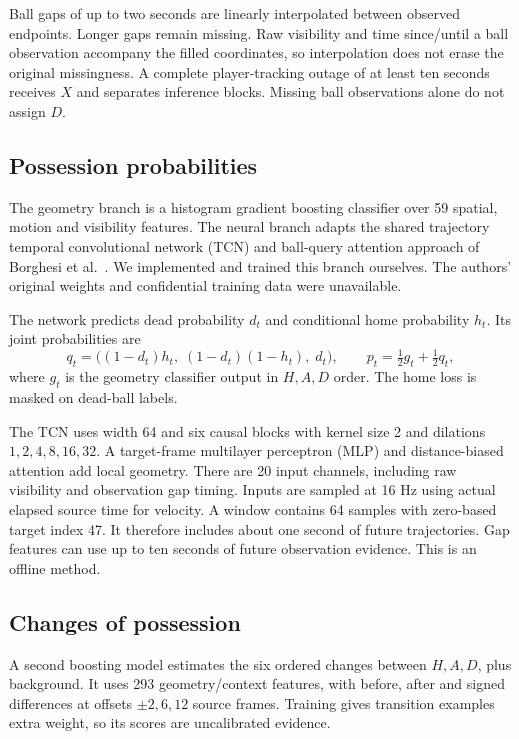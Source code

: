 \documentclass[11pt,a4paper]{article}
\begin{document}
Ball gaps of up to two seconds are linearly interpolated between observed
endpoints. Longer gaps remain missing. Raw visibility and time since/until a ball
observation accompany the filled coordinates, so interpolation does not erase
the original missingness. A complete player-tracking outage of at least ten
seconds receives $X$ and separates inference blocks. Missing ball observations
alone do not assign $D$.

\subsection{Possession probabilities}
The geometry branch is a histogram gradient boosting classifier over 59 spatial,
motion and visibility features. The neural branch adapts the shared trajectory
temporal convolutional network (TCN) and ball-query attention approach of Borghesi et al.~\cite{borghesi}. We
implemented and trained this branch ourselves. The authors' original weights and
confidential training data were unavailable.

The network predicts dead probability $d_t$ and conditional home probability
$h_t$. Its joint probabilities are
\begin{equation}
q_t=\big((1-d_t)h_t,\;(1-d_t)(1-h_t),\;d_t\big),\qquad
p_t=\tfrac12 g_t+\tfrac12 q_t,
\end{equation}
where $g_t$ is the geometry classifier output in $H,A,D$ order. The home loss is
masked on dead-ball labels.

The TCN uses width 64 and six causal blocks with kernel size 2 and dilations
$1,2,4,8,16,32$. A target-frame multilayer perceptron (MLP) and distance-biased attention add local
geometry. There are 20 input channels, including raw visibility and observation
gap timing. Inputs are sampled at 16 Hz using actual elapsed source time for
velocity. A window contains 64 samples with zero-based target index 47. It therefore
includes about one second of future trajectories. Gap features can use up to ten
seconds of future observation evidence. This is an offline method.

\subsection{Changes of possession}
A second boosting model estimates the six ordered changes between $H,A,D$, plus
background. It uses 293 geometry/context features, with before, after and signed
differences at offsets $\pm2,6,12$ source frames. Training gives transition
examples extra weight, so its scores are uncalibrated evidence.
\end{document}
